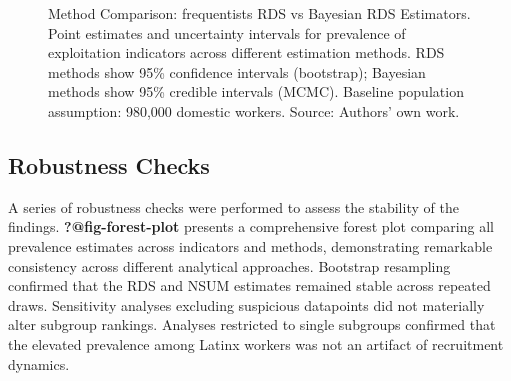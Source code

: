 \documentclass[
  12pt,
  letterpaper,
  DIV=11,
  numbers=noendperiod]{scrartcl}
\theoremstyle{plain}
\theoremstyle{definition}
\begin{document}
\begin{figure}[H]


\caption{\label{fig-method-comparison}Method Comparison: frequentists
RDS vs Bayesian RDS Estimators. Point estimates and uncertainty
intervals for prevalence of exploitation indicators across different
estimation methods. RDS methods show 95\% confidence intervals
(bootstrap); Bayesian methods show 95\% credible intervals (MCMC).
Baseline population assumption: 980,000 domestic workers. Source:
Authors' own work.}

\end{figure}%

\subsection{Robustness Checks}\label{robustness-checks}

A series of robustness checks were performed to assess the stability of
the findings. \textbf{?@fig-forest-plot} presents a comprehensive forest
plot comparing all prevalence estimates across indicators and methods,
demonstrating remarkable consistency across different analytical
approaches. Bootstrap resampling confirmed that the RDS and NSUM
estimates remained stable across repeated draws. Sensitivity analyses
excluding suspicious datapoints did not materially alter subgroup
rankings. Analyses restricted to single subgroups confirmed that the
elevated prevalence among Latinx workers was not an artifact of
recruitment dynamics.
\end{document}
